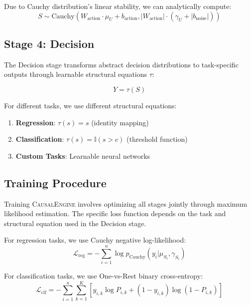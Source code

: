 \documentclass[conference]{IEEEtran}
\newcommand{\causalengine}{\textsc{CausalEngine}}
\newcommand{\cauchy}{\text{Cauchy}}
\newcommand{\indicator}{\mathbb{I}}
\begin{document}
Due to Cauchy distribution's linear stability, we can analytically compute:
\begin{equation}
S \sim \cauchy(W_{\text{action}} \cdot \mu_U + b_{\text{action}}, |W_{\text{action}}| \cdot (\gamma_U + |b_{\text{noise}}|))
\end{equation}

\subsection{Stage 4: Decision}

The Decision stage transforms abstract decision distributions to task-specific outputs through learnable structural equations $\tau$:

\begin{equation}
Y = \tau(S)
\end{equation}

For different tasks, we use different structural equations:
\begin{enumerate}
\item \textbf{Regression}: $\tau(s) = s$ (identity mapping)
\item \textbf{Classification}: $\tau(s) = \indicator(s > c)$ (threshold function)
\item \textbf{Custom Tasks}: Learnable neural networks
\end{enumerate}

\subsection{Training Procedure}

Training \causalengine{} involves optimizing all stages jointly through maximum likelihood estimation. The specific loss function depends on the task and structural equation used in the Decision stage.

For regression tasks, we use Cauchy negative log-likelihood:
\begin{equation}
\mathcal{L}_{\text{reg}} = -\sum_{i=1}^n \log p_{\cauchy}(y_i | \mu_{S_i}, \gamma_{S_i})
\end{equation}

For classification tasks, we use One-vs-Rest binary cross-entropy:
\begin{equation}
\mathcal{L}_{\text{clf}} = -\sum_{i=1}^n \sum_{k=1}^K [y_{i,k} \log P_{i,k} + (1-y_{i,k}) \log(1-P_{i,k})]
\end{equation}
\end{document}
